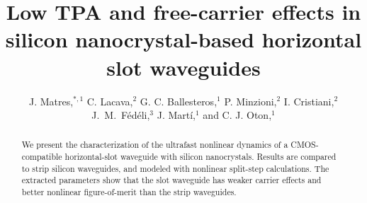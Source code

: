 \documentclass[10pt,letterpaper]{article}
\begin{document}
\title{Low TPA and free-carrier effects in silicon nanocrystal-based horizontal slot waveguides}
\author{J. Matres,$^{*,1}$ C. Lacava,$^2$ G. C. Ballesteros,$^1$ P. Minzioni,$^2$ I. Cristiani,$^2$ J.~M.~F\'ed\'eli,$^3$ J. Mart\'i,$^1$ and C. J. Oton,$^1$} 
\address{$^1$ Nanophotonics Technology Center, \\ Universidad Polit\'ecnica de Valencia, Camino de Vera s/n, 46022, Valencia, Spain\\
$^2$Dipartimento di Ingegneria Industriale e dell'Informazione, Universita di Pavia, Via Ferrata 1, 27100, Pavia, Italy\\
$^3$CEA LETI, Minatec Campus, Grenoble 38054, France}



\begin{abstract}
We present the characterization of the ultrafast nonlinear dynamics of a CMOS-compatible horizontal-slot waveguide with silicon nanocrystals. Results are compared to strip silicon waveguides, and modeled with nonlinear split-step calculations. The extracted parameters show that the slot waveguide has weaker carrier effects and better nonlinear figure-of-merit than the strip waveguides. 
\end{abstract}





\end{document}
